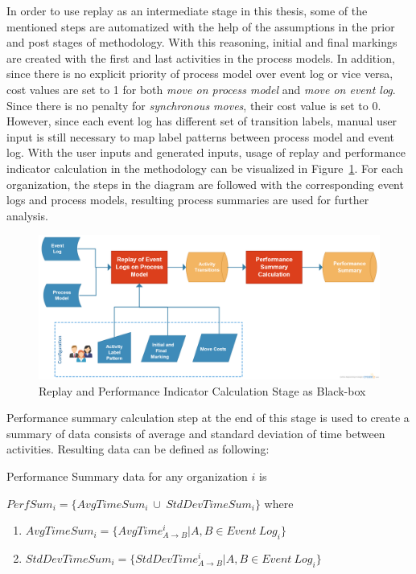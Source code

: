 In order to use replay as an intermediate stage in this thesis, some of the mentioned steps are automatized with the help of the assumptions in the prior and post stages of methodology. With this reasoning, initial and final markings are created with the first and last activities in the process models. In addition, since there is no explicit priority of process model over event log or vice versa, cost values are set to 1 for both \textit{move on process model} and \textit{move on event log}. Since there is no penalty for \textit{synchronous moves}, their cost value is set to 0. However, since each event log has different set of transition labels, manual user input is still necessary to map label patterns between process model and event log. With the user inputs and generated inputs, usage of replay and performance indicator calculation in the methodology can be visualized in Figure~\ref{fig:replay-and-performance-indicator-calculation}. For each organization, the steps in the diagram are followed with the corresponding event logs and process models, resulting process summaries are used for further analysis.

\begin{figure}
  \centering
  \includegraphics[width=\textwidth]{4_methodology/replay-and-performance-indicator-calculation}
  \caption{Replay and Performance Indicator Calculation Stage as Black-box}
  \label{fig:replay-and-performance-indicator-calculation}
\end{figure}

Performance summary calculation step at the end of this stage is used to create a summary of data consists of average and standard deviation of time between activities. Resulting data can be defined as following:
	\theoremstyle{definition}
	\begin{definition}{} Performance Summary data for any organization $i$ is 

	$PerfSum_{i}= \{AvgTimeSum_{i}\ \cup\ StdDevTimeSum_{i}\}$ where
		\begin{enumerate}
			\item $AvgTimeSum_{i} = \{ AvgTime_{A \rightarrow B}^{i} | A , B  \in Event\ Log_{i}\}$
			\item $StdDevTimeSum_{i} = \{ StdDevTime_{ A\rightarrow B}^{i} | A, B  \in Event\ Log_{i}\}$
		\end{enumerate}
	\end{definition}

